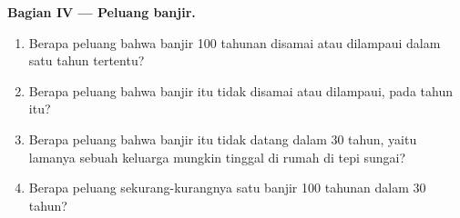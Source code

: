 \begin{problem}
\medskip
\noindent\textbf{Bagian IV --- Peluang banjir.}
\begin{enumerate}[resume]
  \item Berapa peluang bahwa banjir \num{100} tahunan disamai atau dilampaui
        dalam satu tahun tertentu?
  \item Berapa peluang bahwa banjir itu tidak disamai atau dilampaui, pada
        tahun itu?
  \item Berapa peluang bahwa banjir itu tidak datang dalam \num{30} tahun,
        yaitu lamanya sebuah keluarga mungkin tinggal di rumah di tepi sungai?
  \item Berapa peluang sekurang-kurangnya satu banjir \num{100} tahunan dalam
        \num{30} tahun?
\end{enumerate}
\end{problem}
